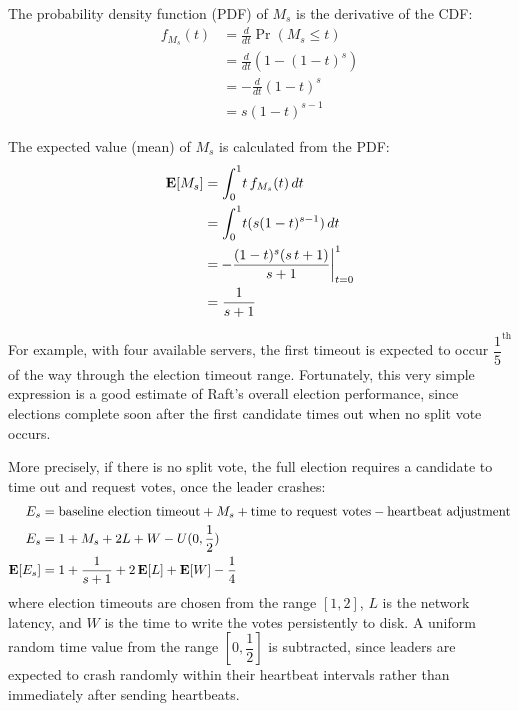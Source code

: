The probability density function (PDF) of $M_s$ is the derivative of the
CDF:
\begin{align*}
 f_{M_s}(t) &= \frac{d}{dt} \Pr(M_s \leq t) \\
        &= \frac{d}{dt} (1-(1-t)^s) \\
        &= -\frac{d}{dt} (1-t)^s \\
        &= s (1-t)^{s-1}
\end{align*}

The expected value (mean) of $M_s$ is calculated from the PDF:
\begin{align*}
 \mathop{\bf E\/}[M_s] &= \int_0^1 \! t \, f_{M_s}(t) \, dt \\
          &= \int_0^1 \! t (s (1-t)^{s-1}) \, dt \\
          &= \left. \! -\frac{(1-t)^s (s\,t+1)}{s+1} \right|_{t=0}^1 \\
          &= \frac{1}{s+1}
\end{align*}

\noindent
For example, with four available servers, the first timeout is expected
to occur $\dfrac{1}{5}^\textrm{th}$ of the way through the election
timeout range. Fortunately, this very simple expression is a good
estimate of Raft's overall election performance, since elections
complete soon after the first candidate times out when no split vote
occurs.

More precisely, if there is no split vote, the full election requires
a candidate to time out and request votes, once the leader crashes:
\begin{align*}
E_s &= \text{baseline election timeout} + M_s + \text{time to request
votes} - \text{heartbeat adjustment} \\
E_s &= 1 + M_s + 2L + W - U(0,\dfrac{1}{2}) \\
\mathop{\bf E\/}[E_s] &= 1 + \frac{1}{s+1} + 2\mathop{\bf E\/}[L] + \mathop{\bf E\/}[W] - \dfrac{1}{4}
\end{align*}
where election timeouts are chosen from the range $[1,2]$,
$L$ is the network latency, and $W$ is the time to write the votes
persistently to disk.
A uniform random time value from the range $[0, \dfrac{1}{2}]$ is
subtracted, since leaders are expected to crash randomly within their
heartbeat intervals rather than immediately after sending heartbeats.
